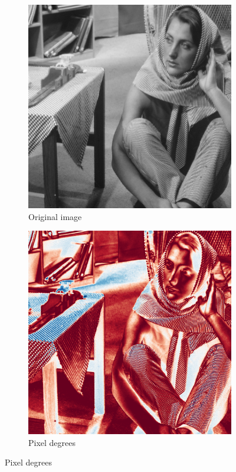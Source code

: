 \begin{figure}[H]
    \centering
    \begin{subfigure}[b]{0.45\textwidth}
        \includegraphics[width=\textwidth]{img/barbara.png}
        \caption{Original image}
    \end{subfigure}
    \begin{subfigure}[b]{0.45\textwidth}
        \includegraphics[width=\textwidth]{img/pixelDegrees.png}
        \caption{Pixel degrees}
    \end{subfigure}
\end{figure}

